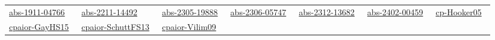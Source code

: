 {\begin{longtable}{*{7}{l}}
\href{articles/abs-1911-04766.pdf}{abs-1911-04766}~\cite{abs-1911-04766} & \href{articles/abs-2211-14492.pdf}{abs-2211-14492}~\cite{abs-2211-14492} & \href{articles/abs-2305-19888.pdf}{abs-2305-19888}~\cite{abs-2305-19888} & \href{articles/abs-2306-05747.pdf}{abs-2306-05747}~\cite{abs-2306-05747} & \href{articles/abs-2312-13682.pdf}{abs-2312-13682}~\cite{abs-2312-13682} & \href{articles/abs-2402-00459.pdf}{abs-2402-00459}~\cite{abs-2402-00459} & \href{papers/cp-Hooker05.pdf}{cp-Hooker05}~\cite{cp-Hooker05}\\ 
\href{papers/cpaior-GayHS15.pdf}{cpaior-GayHS15}~\cite{cpaior-GayHS15} & \href{papers/cpaior-SchuttFS13.pdf}{cpaior-SchuttFS13}~\cite{cpaior-SchuttFS13} & \href{papers/cpaior-Vilim09.pdf}{cpaior-Vilim09}~\cite{cpaior-Vilim09} & \end{longtable}
}

